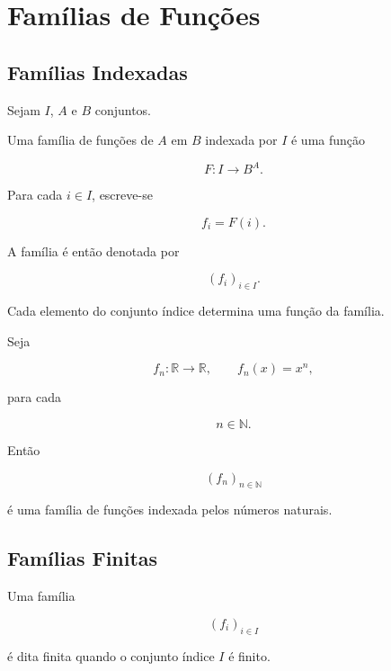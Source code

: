 \documentclass[../../main]{subfiles}
\begin{document}
\section{Famílias de Funções}
\label{sec:matematica:funcoes:familias-de-funcoes}

\subsection{Famílias Indexadas}

\begin{defn}
	\label{def:matematica:funcoes:familias:familia}

	Sejam \(I\), \(A\) e \(B\) conjuntos.

	Uma família de funções de \(A\) em \(B\)
	indexada por \(I\) é uma função

	\[
		F:I\to B^A.
	\]

	Para cada \(i\in I\), escreve-se

	\[
		f_i = F(i).
	\]

	A família é então denotada por

	\[
		(f_i)_{i\in I}.
	\]

\end{defn}

\begin{obs}

	Cada elemento do conjunto índice determina uma função da família.

\end{obs}

\begin{ex}

	Seja

	\[
		f_n:\mathbb R\to\mathbb R,
		\qquad
		f_n(x)=x^n,
	\]

	para cada

	\[
		n\in\mathbb N.
	\]

	Então

	\[
		(f_n)_{n\in\mathbb N}
	\]

	é uma família de funções indexada pelos números naturais.

\end{ex}

\subsection{Famílias Finitas}

\begin{defn}
	\label{def:matematica:funcoes:familias:finita}

	Uma família

	\[
		(f_i)_{i\in I}
	\]

	é dita finita quando o conjunto índice \(I\) é finito.

\end{defn}
\end{document}
